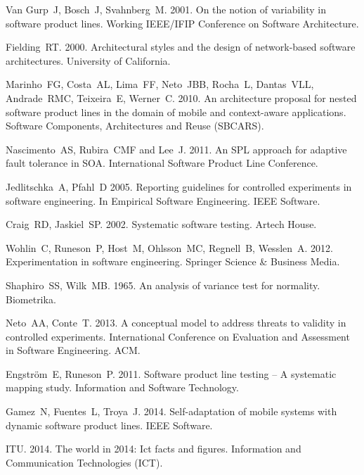 \documentclass{kais}
\begin{document}
\begin{thebibliography}{99}
 Van Gurp~J, Bosch~J, Svahnberg~M. 2001. On the notion of variability in software product lines. Working IEEE/IFIP Conference on Software Architecture.

 Fielding~RT. 2000. Architectural styles and the design of network-based software architectures. University of California.

 Marinho~FG, Costa~AL, Lima~FF, Neto~JBB, Rocha~L, Dantas~VLL, Andrade~RMC, Teixeira~E, Werner~C. 2010. An architecture proposal for nested software product lines in the domain of mobile and context-aware applications. Software Components, Architectures and Reuse (SBCARS).

 Nascimento~AS, Rubira~CMF and Lee~J. 2011. An SPL approach for adaptive fault tolerance in SOA. International Software Product Line Conference.

 Jedlitschka~A, Pfahl~D 2005. Reporting guidelines for controlled experiments in software engineering. In Empirical Software Engineering. IEEE Software.

 Craig~RD, Jaskiel~SP. 2002. Systematic software testing. Artech House.

 Wohlin~C, Runeson~P, Host~M, Ohlsson~MC, Regnell~B, Wesslen~A. 2012. Experimentation in software engineering. Springer Science \& Business Media.

 Shaphiro~SS, Wilk~MB. 1965. An analysis of variance test for normality. Biometrika.

 Neto~AA, Conte~T. 2013. A conceptual model to address threats to validity in controlled experiments. International Conference on Evaluation and Assessment in Software Engineering. ACM.

 Engstr\"{o}m~E, Runeson~P. 2011. Software product line testing -- A systematic mapping study. Information and Software Technology.

 Gamez~N, Fuentes~L, Troya~J. 2014. Self-adaptation of mobile systems with dynamic software product lines. IEEE Software.

 ITU. 2014. The world in 2014: Ict facts and figures. Information and Communication Technologies (ICT).

\end{thebibliography}
\end{document}
